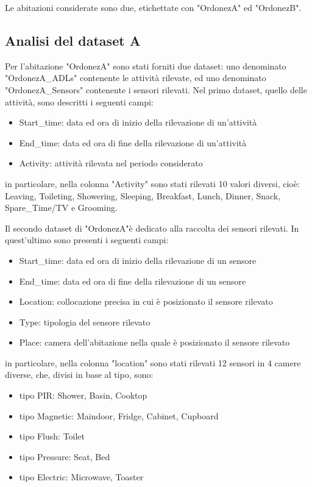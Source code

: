 \documentclass[10pt,a4paper]{article}
\begin{document}
	Le abitazioni considerate sono due, etichettate con "OrdonezA" ed "OrdonezB".
	\subsection{Analisi del dataset A}
	Per l'abitazione "OrdonezA" sono stati forniti due dataset: uno denominato "OrdonezA\_ADLs" contenente le attività rilevate, ed uno denominato "OrdonezA\_Sensors" contenente i sensori rilevati.
	Nel primo dataset, quello delle attività, sono descritti i seguenti campi:
	\begin{itemize}
		\item Start\_time: data ed ora di inizio della rilevazione di un'attività
		\item End\_time: data ed ora di fine della rilevazione di un'attività
		\item  Activity: attività rilevata nel periodo considerato
	\end{itemize}
	
	in particolare, nella colonna "Activity" sono stati rilevati 10 valori diversi, cioè: Leaving, Toileting, Showering, Sleeping, Breakfast, Lunch, Dinner, Snack, Spare\_Time/TV e Grooming. 
	
	Il secondo dataset di "OrdonezA"è dedicato alla raccolta dei sensori rilevati. In quest'ultimo sono presenti i seguenti campi:
	\begin{itemize}
		\item Start\_time: data ed ora di inizio della rilevazione di un sensore
		\item End\_time: data ed ora di fine della rilevazione di un sensore
		\item  Location: collocazione precisa in cui è posizionato il sensore rilevato
		\item Type: tipologia del sensore rilevato
		\item Place: camera dell'abitazione nella quale è posizionato il sensore rilevato
	\end{itemize}
	
	in particolare, nella colonna "location" sono stati rilevati 12 sensori in 4 camere diverse, che, divisi in base al tipo, sono:
	
	\begin{itemize}
		\item tipo PIR: Shower, Basin, Cooktop
		\item tipo Magnetic: Maindoor, Fridge, Cabinet, Cupboard
		\item  tipo Flush: Toilet
		\item tipo Pressure: Seat, Bed
		\item tipo Electric: Microwave, Toaster
	\end{itemize}
	
\end{document}
